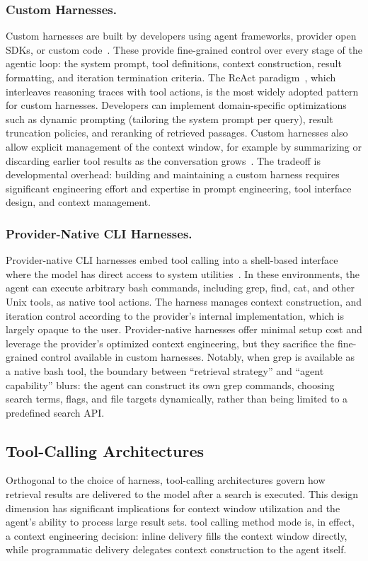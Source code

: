 \documentclass[sigconf,nonacm]{acmart}
\begin{document}
\subsubsection{Custom Harnesses.}
Custom harnesses are built by developers using agent frameworks, provider open SDKs, or custom code~\cite{yao2023react,sumers2023coala}. These provide fine-grained control over every stage of the agentic loop: the system prompt, tool definitions, context construction, result formatting, and iteration termination criteria. The ReAct paradigm~\cite{yao2023react}, which interleaves reasoning traces with tool actions, is the most widely adopted pattern for custom harnesses. Developers can implement domain-specific optimizations such as dynamic prompting (tailoring the system prompt per query), result truncation policies, and reranking of retrieved passages. Custom harnesses also allow explicit management of the context window, for example by summarizing or discarding earlier tool results as the conversation grows~\cite{memtool2025,packer2023memgpt}. The tradeoff is developmental overhead: building and maintaining a custom harness requires significant engineering effort and expertise in prompt engineering, tool interface design, and context management.

\subsubsection{Provider-Native CLI Harnesses.}
Provider-native CLI harnesses embed tool calling into a shell-based interface where the model has direct access to system utilities~\cite{yang2024sweagent,chen2021codex}. In these environments, the agent can execute arbitrary bash commands, including grep, find, cat, and other Unix tools, as native tool actions. The harness manages context construction, and iteration control according to the provider's internal implementation, which is largely opaque to the user. Provider-native harnesses offer minimal setup cost and leverage the provider's optimized context engineering, but they sacrifice the fine-grained control available in custom harnesses. Notably, when grep is available as a native bash tool, the boundary between ``retrieval strategy'' and ``agent capability'' blurs: the agent can construct its own grep commands, choosing search terms, flags, and file targets dynamically, rather than being limited to a predefined search API.

\subsection{Tool-Calling Architectures}
\label{sec:tool-calling}
Orthogonal to the choice of harness, tool-calling architectures govern how retrieval results are delivered to the model after a search is executed. This design dimension has significant implications for context window utilization and the agent's ability to process large result sets. tool calling method mode is, in effect, a context engineering decision: inline delivery fills the context window directly, while programmatic delivery delegates context construction to the agent itself.
\end{document}
